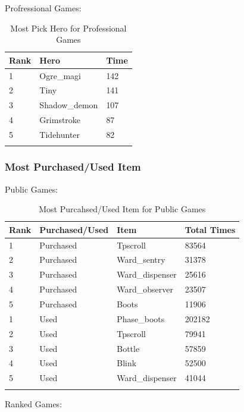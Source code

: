\documentclass{article}
\begin{document}
Profressional Games:

\begin{longtable}{|p{2cm}|p{3cm}|p{4.5cm}|}

\hline
\textbf{Rank} & \textbf{Hero} & \textbf{Time} \\
\hline
\endhead

1 & Ogre\_magi & 142 \\\hline
2 & Tiny & 141 \\\hline
3 & Shadow\_demon & 107 \\\hline
4 & Grimstroke & 87 \\\hline
5 & Tidehunter & 82 \\\hline

\caption{Most Pick Hero for Professional Games}
\label{most-pick-hero-for-professional-games}
\end{longtable}

\subsubsection{Most Purchased/Used Item}

Public Games:

\begin{longtable}{|p{2cm}|p{2cm}|p{3.5cm}|p{2.5cm}|}

\hline
\textbf{Rank} & \textbf{Purchased/Used} & \textbf{Item} & \textbf{Total Times} \\
\hline
\endhead

1 & Purchased & Tpscroll & 83564 \\\hline
2 & Purchased & Ward\_sentry & 31378 \\\hline
3 & Purchased & Ward\_dispenser & 25616 \\\hline
4 & Purchased & Ward\_observer & 23507 \\\hline
5 & Purchased & Boots & 11906 \\\hline
1 & Used & Phase\_boots & 202182 \\\hline
2 & Used & Tpscroll & 79941 \\\hline
3 & Used & Bottle & 57859 \\\hline
4 & Used & Blink & 52500 \\\hline
5 & Used & Ward\_dispenser & 41044 \\\hline

\caption{Most Purcahsed/Used Item for Public Games}
\label{most-purchased-used-item-for-public-games}
\end{longtable}


Ranked Games:
\end{document}
